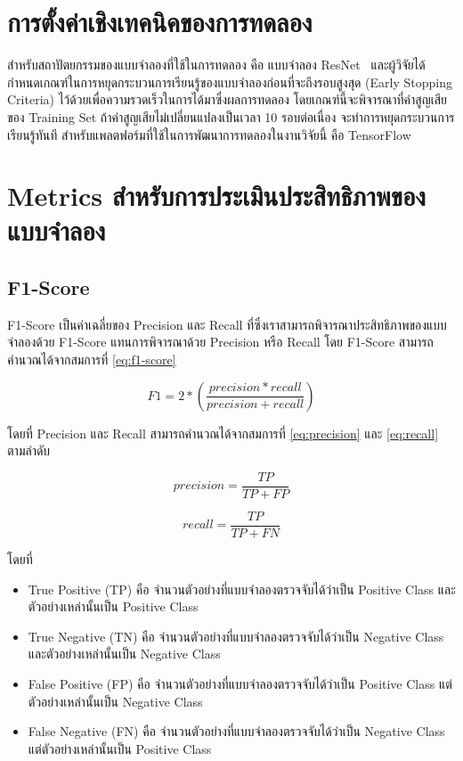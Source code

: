 \section{การตั้งค่าเชิงเทคนิคของการทดลอง}
สำหรับสถาปัตยกรรมของแบบจำลองที่ใช้ในการทดลอง คือ แบบจำลอง ResNet~\citep{He:2016} และผู้วิจัยได้กำหนดเกณฑ์ในการหยุดกระบวนการเรียนรู้ของแบบจำลองก่อนที่จะถึงรอบสูงสุด (Early Stopping Criteria) ไว้ด้วยเพื่อความรวดเร็วในการได้มาซึ่งผลการทดลอง โดยเกณฑ์นี้จะพิจารณาที่ค่าสูญเสียของ Training Set ถ้าค่าสูญเสียไม่เปลี่ยนแปลงเป็นเวลา 10 รอบต่อเนื่อง จะทำการหยุดกระบวนการเรียนรู้ทันที สำหรับแพลตฟอร์มที่ใช้ในการพัฒนาการทดลองในงานวิจัยนี้ คือ TensorFlow~\cite{Abadi:2016}

\section{Metrics สำหรับการประเมินประสิทธิภาพของแบบจำลอง}
\subsection{F1-Score}
F1-Score เป็นค่าเฉลี่ยของ Precision และ Recall ที่ซึ่งเราสามารถพิจารณาประสิทธิภาพของแบบจำลองด้วย F1-Score แทนการพิจารณาด้วย Precision หรือ Recall โดย F1-Score สามารถคำนวณได้จากสมการที่ \ref{eq:f1-score}

\begin{equation}
  F1 = 2 * \left ( \frac{precision * recall}{precision + recall} \right )
  \label{eq:f1-score}
\end{equation}

โดยที่ Precision และ Recall สามารถคำนวณได้จากสมการที่ \ref{eq:precision} และ \ref{eq:recall} ตามลำดับ

\begin{equation}
  precision = \frac{TP}{TP + FP}
  \label{eq:precision}
\end{equation}

\begin{equation}
  recall = \frac{TP}{TP + FN}
  \label{eq:recall}
\end{equation}

โดยที่

\begin{itemize}
  \item True Positive (TP) คือ จำนวนตัวอย่างที่แบบจำลองตรวจจับได้ว่าเป็น Positive Class และตัวอย่างเหล่านั้นเป็น Positive Class
  \item True Negative (TN) คือ จำนวนตัวอย่างที่แบบจำลองตรวจจับได้ว่าเป็น Negative Class และตัวอย่างเหล่านั้นเป็น Negative Class
  \item False Positive (FP) คือ จำนวนตัวอย่างที่แบบจำลองตรวจจับได้ว่าเป็น Positive Class แต่ตัวอย่างเหล่านั้นเป็น Negative Class
  \item False Negative (FN) คือ จำนวนตัวอย่างที่แบบจำลองตรวจจับได้ว่าเป็น Negative Class แต่ตัวอย่างเหล่านั้นเป็น Positive Class
\end{itemize}

